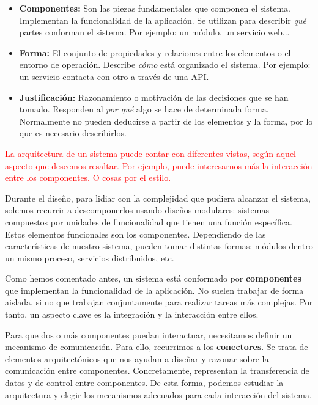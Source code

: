     \begin{itemize}
        \item \textbf{Componentes:} Son las piezas fundamentales que componen el sistema. Implementan la funcionalidad de la aplicación. Se utilizan para describir \textit{qué} partes conforman el sistema. Por ejemplo: un módulo, un servicio web...

        \item \textbf{Forma:} El conjunto de propiedades y relaciones entre los elementos o el entorno de operación. Describe \textit{cómo} está organizado el sistema. Por ejemplo: un servicio contacta con otro a través de una API.

        \item \textbf{Justificación:} Razonamiento o motivación de las decisiones que se han tomado. Responden al \textit{por qué} algo se hace de determinada forma. Normalmente no pueden deducirse a partir de los elementos y la forma, por lo que es necesario describirlos.

    \end{itemize}

\textcolor{red}{La arquitectura de un sistema puede contar con diferentes vistas, según aquel aspecto que deseemos resaltar. Por ejemplo, puede interesarnos más la interacción entre los componentes. O cosas por el estilo.}

Durante el diseño, para lidiar con la complejidad que pudiera alcanzar el sistema, solemos recurrir a descomponerlos usando diseños modulares: sistemas compuestos por unidades de funcionalidad que tienen una función específica. \cite{taylorSoftwareArchitectureFoundations2009} Estos elementos funcionales son los componentes. Dependiendo de las características de nuestro sistema, pueden tomar distintas formas: módulos dentro un mismo proceso, servicios distribuidos, etc.

Como hemos comentado antes, un sistema está conformado por \textbf{componentes} que implementan la funcionalidad de la aplicación. No suelen trabajar de forma aislada, si no que trabajan conjuntamente para realizar tareas más complejas. Por tanto, un aspecto clave es la integración y la interacción entre ellos. \cite{mehtaTaxonomySoftwareConnectors2000}

Para que dos o más componentes puedan interactuar, necesitamos definir un mecanismo de comunicación. Para ello, recurrimos a los \textbf{conectores}. Se trata de elementos arquitectónicos que nos ayudan a diseñar y razonar sobre la comunicación entre componentes. Concretamente, representan la transferencia de datos y de control entre componentes. De esta forma, podemos estudiar la arquitectura y elegir los mecanismos adecuados para cada interacción del sistema. \cite{taylorSoftwareArchitectureFoundations2009}

